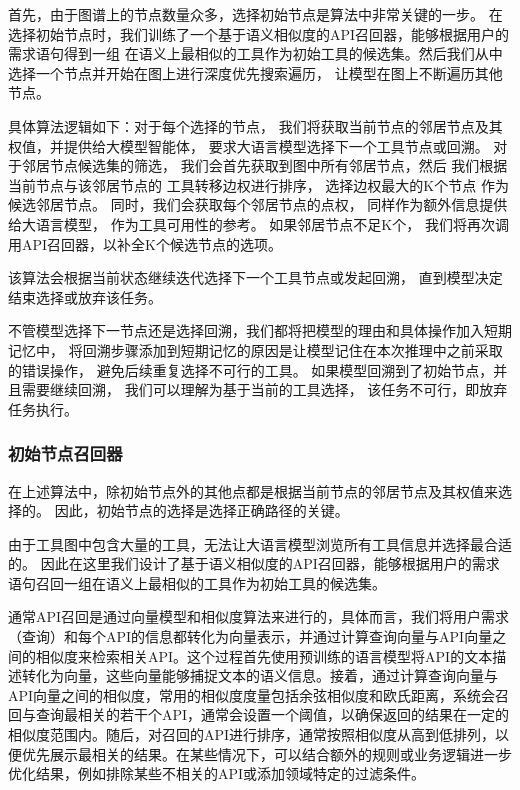 首先，由于图谱上的节点数量众多，选择初始节点是算法中非常关键的一步。
在选择初始节点时，我们训练了一个基于语义相似度的API召回器，能够根据用户的需求语句得到一组
在语义上最相似的工具作为初始工具的候选集。然后我们从中选择一个节点并开始在图上进行深度优先搜索遍历，
让模型在图上不断遍历其他节点。

具体算法逻辑如下：对于每个选择的节点，
我们将获取当前节点的邻居节点及其权值，并提供给大模型智能体，
要求大语言模型选择下一个工具节点或回溯。
对于邻居节点候选集的筛选，
我们会首先获取到图中所有邻居节点，然后
我们根据当前节点与该邻居节点的
工具转移边权进行排序，
选择边权最大的K个节点
作为候选邻居节点。
同时，我们会获取每个邻居节点的点权，
同样作为额外信息提供给大语言模型，
作为工具可用性的参考。
如果邻居节点不足K个，
我们将再次调用API召回器，以补全K个候选节点的选项。

该算法会根据当前状态继续迭代选择下一个工具节点或发起回溯，
直到模型决定结束选择或放弃该任务。

不管模型选择下一节点还是选择回溯，我们都将把模型的理由和具体操作加入短期记忆中，
将回溯步骤添加到短期记忆的原因是让模型记住在本次推理中之前采取的错误操作，
避免后续重复选择不可行的工具。
如果模型回溯到了初始节点，并且需要继续回溯，
我们可以理解为基于当前的工具选择，
该任务不可行，即放弃任务执行。

\subsubsection{初始节点召回器}

在上述算法中，除初始节点外的其他点都是根据当前节点的邻居节点及其权值来选择的。
因此，初始节点的选择是选择正确路径的关键。

由于工具图中包含大量的工具，无法让大语言模型浏览所有工具信息并选择最合适的。
因此在这里我们设计了基于语义相似度的API召回器，能够根据用户的需求语句召回一组在语义上最相似的工具作为初始工具的候选集。

通常API召回是通过向量模型和相似度算法来进行的，具体而言，我们将用户需求（查询）和每个API的信息都转化为向量表示，并通过计算查询向量与API向量之间的相似度来检索相关API。这个过程首先使用预训练的语言模型将API的文本描述转化为向量，这些向量能够捕捉文本的语义信息。接着，通过计算查询向量与API向量之间的相似度，常用的相似度度量包括余弦相似度和欧氏距离，系统会召回与查询最相关的若干个API，通常会设置一个阈值，以确保返回的结果在一定的相似度范围内。随后，对召回的API进行排序，通常按照相似度从高到低排列，以便优先展示最相关的结果。在某些情况下，可以结合额外的规则或业务逻辑进一步优化结果，例如排除某些不相关的API或添加领域特定的过滤条件。

